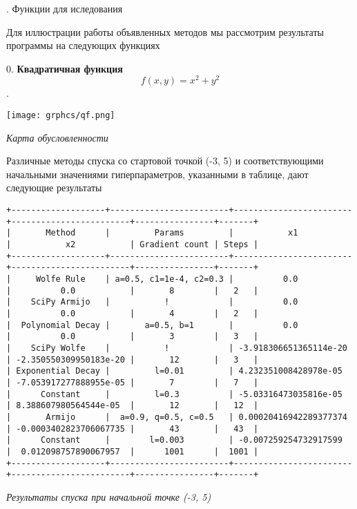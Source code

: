 \documentclass{article}
\begin{document}


\begin{center}
    {. Функции для иследования}
\end{center}

Для иллюстрации работы объявленных методов мы рассмотрим результаты программы на следующих функциях


\begin{enumerate}
    0. { \bf Квадратичная функция }
    $$ f(x, y) = x^2 + y^2 $$.
\end{enumerate}

\begin{center}
    \texttt{[image: grphcs/qf.png]}

    { \it Карта обусловленности}
\end{center}

Различные методы спуска со стартовой точкой (-3, 5) и соответствующими начальными значениями гиперпараметров, указанными в таблице, дают следующие результаты

\begin{center}
{ \scriptsize
\begin{verbatim}
+-------------------+------------------------+------------------------+------------------------+----------------+-------+
|       Method      |         Params         |           x1           |           x2           | Gradient count | Steps |
+-------------------+------------------------+------------------------+------------------------+----------------+-------+
|     Wolfe Rule    | a=0.5, c1=1e-4, c2=0.3 |          0.0           |          0.0           |       8        |   2   |
|    SciPy Armijo   |           !            |          0.0           |          0.0           |       4        |   2   |
|  Polynomial Decay |       a=0.5, b=1       |          0.0           |          0.0           |       3        |   3   |
|    SciPy Wolfe    |           !            | -3.918306651365114e-20 | -2.350550309950183e-20 |       12       |   3   |
| Exponential Decay |         l=0.01         | 4.232351008428978e-05  | -7.053917277888955e-05 |       7        |   7   |
|      Constant     |         l=0.3          | -5.03316473035816e-05  | 8.388607980564544e-05  |       12       |   12  |
|       Armijo      |  a=0.9, q=0.5, c=0.5   | 0.00020416942289377374 | -0.0003402823706067735 |       43       |   43  |
|      Constant     |        l=0.003         | -0.007259254732917599  |  0.012098757890067957  |      1001      |  1001 |
+-------------------+------------------------+------------------------+------------------------+----------------+-------+
\end{verbatim}
}
{ \it Результаты спуска при начальной точке (-3, 5)}
\end{center}
\end{document}
